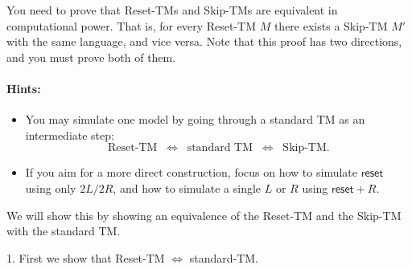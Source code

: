 \documentclass[11pt]{article}
\begin{document}
\begin{enumerate}
You need to prove that Reset-TMs and Skip-TMs are equivalent in computational power.
That is, for every Reset-TM \(M\) there exists a Skip-TM \(M'\) with the same language, and vice versa. Note that this proof has two directions, and you must prove both of them.

\paragraph{Hints:}
\begin{itemize}
  \item You may simulate one model by going through a standard TM as an intermediate step:
  \[
     \text{Reset-TM} \;\;\Longleftrightarrow\;\;\text{standard TM}\;\;\Longleftrightarrow\;\;\text{Skip-TM}.
  \]
  \item If you aim for a more direct construction, focus on how to simulate 
        $\textsf{reset}$ using only $2L/2R$, and how to simulate a single $L$ or $R$ using $\textsf{reset}+R$.
\end{itemize}


\begin{answer}

    We will show this by showing an equivalence of the Reset-TM and the Skip-TM with the standard TM.

    1. First we show that Reset-TM $\iff$ standard-TM.
    
    \vspace{1em}
    

\end{answer}
\end{enumerate}
\end{document}
